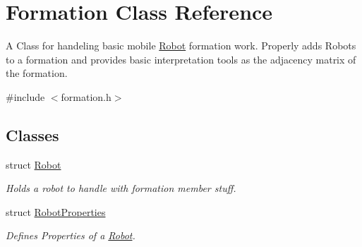 \hypertarget{classFormation}{}\section{Formation Class Reference}
\label{classFormation}


A Class for handeling basic mobile \hyperlink{structFormation_1_1Robot}{Robot} formation work. Properly adds Robots to a formation and provides basic interpretation tools as the adjacency matrix of the formation.  




{\ttfamily \#include $<$formation.\+h$>$}

\subsection*{Classes}
\begin{DoxyCompactItemize}
\item 
struct \hyperlink{structFormation_1_1Robot}{Robot}
\begin{DoxyCompactList}\small\item\em Holds a robot to handle with formation member stuff. \end{DoxyCompactList}\item 
struct \hyperlink{structFormation_1_1RobotProperties}{Robot\+Properties}
\begin{DoxyCompactList}\small\item\em Defines Properties of a \hyperlink{structFormation_1_1Robot}{Robot}. \end{DoxyCompactList}\end{DoxyCompactItemize}
